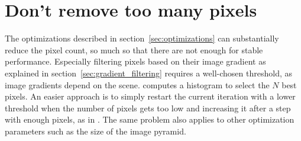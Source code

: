 \section{Don't remove too many pixels}

The optimizations described in section~\ref{sec:optimizations} can
substantially reduce the pixel count, so much so that there are not enough for
stable performance. Especially filtering pixels based on their image gradient
as explained in section~\ref{sec:gradient_filtering} requires a well-chosen
threshold, as image gradients depend on the scene. \cite{comport2007odometry}
computes a histogram to select the $N$ best pixels. An easier approach is to
simply restart the current iteration with a lower threshold when the number of
pixels gets too low and increasing it after a step with enough pixels, as in
\cite{omaridenseodometry}. The same problem also applies to other optimization
parameters such as the size of the image pyramid.
